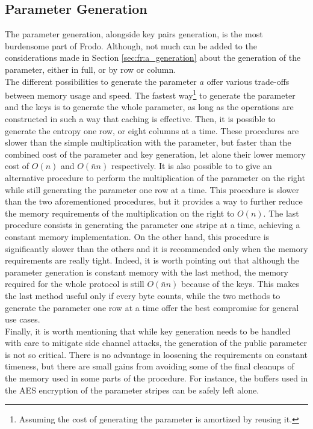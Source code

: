 \subsection{Parameter Generation}
The parameter generation, alongside key pairs generation, is the most burdensome part of Frodo. Although, not much can be added to the considerations made in Section \ref{sec:fr:a_generation} about the generation of the parameter, either in full, or by row or column.\\
The different possibilities to generate the parameter $a$ offer various trade-offs between memory usage and speed. The fastest way\footnote{Assuming the cost of generating the parameter is amortized by reusing it.} to generate the parameter and the keys is to generate the whole parameter, as long as the operations are constructed in such a way that caching is effective. Then, it is possible to generate the entropy one row, or eight columns at a time. These procedures are slower than the simple multiplication with the parameter, but faster than the combined cost of the parameter and key generation, let alone their lower memory cost of $O(n)$ and $O(\bar{n}n)$ respectively. It is also possible to to give an alternative procedure to perform the multiplication of the parameter on the right while still generating the parameter one row at a time. This procedure is slower than the two aforementioned procedures, but it provides a way to further reduce the memory requirements of the multiplication on the right to $O(n)$. The last procedure consists in generating the parameter one stripe at a time, achieving a constant memory implementation. On the other hand, this procedure is significantly slower than the others and it is recommended only when the memory requirements are really tight. Indeed, it is worth pointing out that although the parameter generation is constant memory with the last method, the memory required for the whole protocol is still $O(\bar{n}n)$ because of the keys. This makes the last method useful only if every byte counts, while the two methods to generate the parameter one row at a time offer the best compromise for general use cases.\\
Finally, it is worth mentioning that while key generation needs to be handled with care to mitigate side channel attacks, the generation of the public parameter is not so critical. There is no advantage in loosening the requirements on constant timeness, but there are small gains from avoiding some of the final cleanups of the memory used in some parts of the procedure. For instance, the buffers used in the AES encryption of the parameter stripes can be safely left alone.\\


